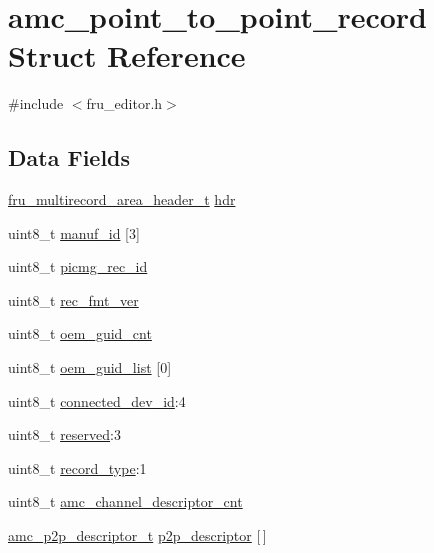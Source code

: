 \hypertarget{structamc__point__to__point__record}{\section{amc\-\_\-point\-\_\-to\-\_\-point\-\_\-record Struct Reference}
\label{structamc__point__to__point__record}
}


{\ttfamily \#include $<$fru\-\_\-editor.\-h$>$}

\subsection*{Data Fields}
\begin{DoxyCompactItemize}
\item 
\hyperlink{fru__editor_8h_ad6ac8d0278f7506c13b930cb39a818b3}{fru\-\_\-multirecord\-\_\-area\-\_\-header\-\_\-t} \hyperlink{structamc__point__to__point__record_ad87ea7107604a0f6b4908d022dc02eab}{hdr}
\item 
uint8\-\_\-t \hyperlink{structamc__point__to__point__record_a6a71cacd88dcc5413a0c1f5d638ddef9}{manuf\-\_\-id} \mbox{[}3\mbox{]}
\item 
uint8\-\_\-t \hyperlink{structamc__point__to__point__record_a9efe6a6e7e481eef8537515758eeeae6}{picmg\-\_\-rec\-\_\-id}
\item 
uint8\-\_\-t \hyperlink{structamc__point__to__point__record_a0bc6e0ecfe6c321f9cc6b47f8ada446b}{rec\-\_\-fmt\-\_\-ver}
\item 
uint8\-\_\-t \hyperlink{structamc__point__to__point__record_aae7ac0d4e4e11d1c26b9803a271c2515}{oem\-\_\-guid\-\_\-cnt}
\item 
uint8\-\_\-t \hyperlink{structamc__point__to__point__record_a0757dffd2446662228acb6a739d5ac90}{oem\-\_\-guid\-\_\-list} \mbox{[}0\mbox{]}
\item 
uint8\-\_\-t \hyperlink{structamc__point__to__point__record_aeadd6f5f3317628ea482df99101492d6}{connected\-\_\-dev\-\_\-id}\-:4
\item 
uint8\-\_\-t \hyperlink{structamc__point__to__point__record_afab261eec70e662f0122dfaebd2caf9c}{reserved}\-:3
\item 
uint8\-\_\-t \hyperlink{structamc__point__to__point__record_a3973c1edc3b23ab9ad298d5bde29cbcd}{record\-\_\-type}\-:1
\item 
uint8\-\_\-t \hyperlink{structamc__point__to__point__record_a8632f0a14a3d9df01137d9f0a1ea9fa2}{amc\-\_\-channel\-\_\-descriptor\-\_\-cnt}
\item 
\hyperlink{structamc__p2p__descriptor__t}{amc\-\_\-p2p\-\_\-descriptor\-\_\-t} \hyperlink{structamc__point__to__point__record_a80efbb30e82570e4282cd1cc91aea10b}{p2p\-\_\-descriptor} \mbox{[}$\,$\mbox{]}
\end{DoxyCompactItemize}


